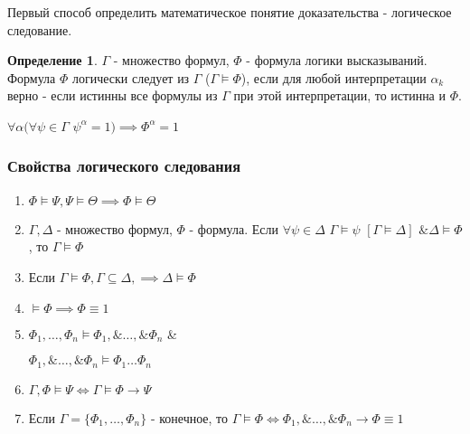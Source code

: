 \documentclass[a4paper]{article}
\theoremstyle{definition}
\newtheorem*{definition}{Определение}
\theoremstyle{remark}
\begin{document}
    Первый способ определить математическое понятие доказательства - логическое следование.
    \begin{definition}
        $\Gamma $ - множество формул, $\Phi$  - формула логики высказываний. Формула $ \Phi$  логически следует из $\Gamma$ ($\Gamma \models \Phi $), если для любой интерпретации
        $\alpha_k$ верно - если истинны все формулы из $\Gamma$ при этой интерпретации, то истинна и $\Phi$.

        $\forall \alpha (\forall \psi \in \Gamma$ $\psi^\alpha = 1)\implies \Phi^\alpha = 1$
    \end{definition}
    \subsubsection*{Свойства логического следования}
    \begin{enumerate}
        \item $\Phi \models \Psi, \Psi \models \Theta \implies \Phi \models \Theta$
        \item $\Gamma, \Delta $ - множество формул, $\Phi$ - формула. Если $\forall \psi\in\Delta$ $\Gamma\models\psi$ $[\Gamma \models \Delta]$ $\&\Delta\models\Phi$, то $\Gamma\models\Phi$
        \item Если $\Gamma \models \Phi, \Gamma \subseteq \Delta, \implies \Delta \models \Phi$
        \item $\models \Phi \implies \Phi \equiv 1$
        \item $\Phi_1, \dots, \Phi_n\models \Phi_1,\& \dots,\& \Phi_n$ \& 
        
        $\Phi_1,\& \dots,\& \Phi_n\models\Phi_1 \dots \Phi_n$
        \item $\Gamma, \Phi\models \Psi\Leftrightarrow \Gamma \models \Phi \to \Psi$
        \item Если $\Gamma = \{\Phi_1, \dots, \Phi_n \}$ - конечное, то $\Gamma \models \Phi \Leftrightarrow \Phi_1,\& \dots,\& \Phi_n\to \Phi \equiv 1$
    \end{enumerate}
\end{document}

